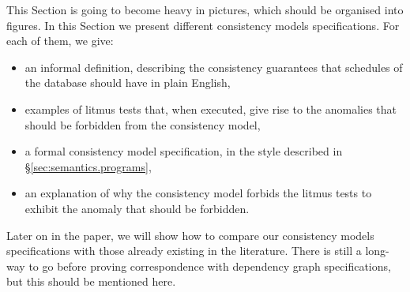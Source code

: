 \ac{This Section is going to become heavy in pictures, which should be 
organised into figures.}
In this Section we present different consistency models specifications. 
For each of them, we give: 
\begin{itemize}
\item an informal definition, describing the consistency guarantees that 
schedules of the database should have in plain English, 
\item examples of litmus tests that, when executed,  give rise to the anomalies that should be forbidden 
from the consistency model, 
\item a formal consistency model specification, in the style described in \S \ref{sec:semantics.programs},
\item an explanation of why the consistency model forbids the litmus tests to exhibit the anomaly that 
should be forbidden. 
\end{itemize}
Later on in the paper, we will show how to compare our consistency 
models specifications with those already existing in the 
literature.
\ac{There is still a long-way to go before proving correspondence with dependency graph specifications, 
but this should be mentioned here.}

